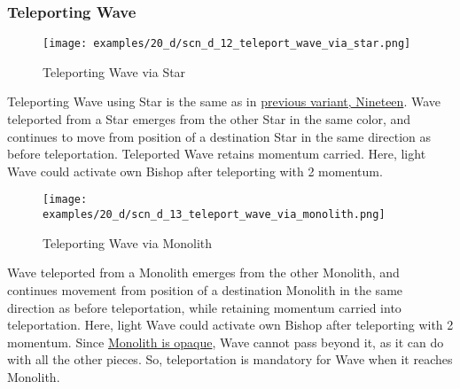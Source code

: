 \subsubsection*{Teleporting Wave}
\label{sec:Discovery/Monolith/Teleporting/Teleporting Wave}

\vspace*{-1.4\baselineskip}
\noindent
\begin{figure}[!h]
\texttt{[image: examples/20\_d/scn\_d\_12\_teleport\_wave\_via\_star.png]}
\vspace*{-1.3\baselineskip}
\caption{Teleporting Wave via Star}
\label{fig:scn_d_12_teleport_wave_via_star}
\end{figure}

\vspace*{-0.4\baselineskip}
Teleporting Wave using Star is the same as in \hyperref[fig:scn_n_04_teleport_move_3]{previous variant, Nineteen}.
Wave teleported from a Star emerges from the other Star in the same color,
and continues to move from position of a destination Star in the same
direction as before teleportation. Teleported Wave retains momentum carried.
Here, light Wave could activate own Bishop after teleporting with 2 momentum.

\clearpage %

\vspace*{-2.3\baselineskip}
\noindent
\begin{figure}[!h]
\texttt{[image: examples/20\_d/scn\_d\_13\_teleport\_wave\_via\_monolith.png]}
\vspace*{-1.3\baselineskip}
\caption{Teleporting Wave via Monolith}
\label{fig:scn_d_13_teleport_wave_via_monolith}
\end{figure}

\vspace*{-0.3\baselineskip}
Wave teleported from a Monolith emerges from the other Monolith, and continues
movement from position of a destination Monolith in the same direction as before
teleportation, while retaining momentum carried into teleportation.
Here, light Wave could activate own Bishop after teleporting with 2 momentum. \newline
Since \hyperref[fig:scn_d_09_monolith_is_opaque]{Monolith is opaque}, Wave cannot
pass beyond it, as it can do with all the other pieces. So, teleportation is
mandatory for Wave when it reaches Monolith.

